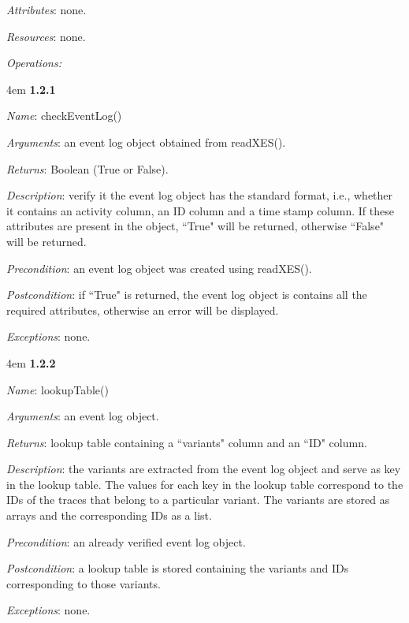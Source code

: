 \documentclass[notitlepage]{article}
\begin{document}
\begin{flushleft}
\textit{Attributes}: none.

\textit{Resources}: none.

\textit{Operations: }
\medskip


\par
\begingroup
\leftskip4em
\textbf{1.2.1} 

\textit{Name}: checkEventLog()

\textit{Arguments}: an event log object obtained from readXES().

\textit{Returns}: Boolean (True or False).

\textit{Description}: verify it the event log object has the standard format, i.e., whether it contains an activity column, an ID column and a time stamp column. If these attributes are present in the object, ``True" will be returned, otherwise ``False" will be returned. 

\textit{Precondition}: an event log object was created using readXES().

\textit{Postcondition}: if ``True" is returned, the event log object is contains all the required attributes, otherwise an error will be displayed.

\textit{Exceptions}: none.
\par
\endgroup

\medskip

\par
\begingroup
\leftskip4em
\textbf{1.2.2}

\textit{Name}: lookupTable()

\textit{Arguments}: an event log object.

\textit{Returns}: lookup table containing a ``variants" column and an ``ID" column.

\textit{Description}: the variants are extracted from the event log object and serve as key in the lookup table. The values for each key in the lookup table correspond to the IDs of the traces that belong to a particular variant. The variants are stored as arrays and the corresponding IDs as a list.

\textit{Precondition}: an already verified event log object.

\textit{Postcondition}: a lookup table is stored containing the variants and IDs corresponding to those variants.

\textit{Exceptions}: none.

\par
\endgroup

\medskip


\end{flushleft}
\end{document}
